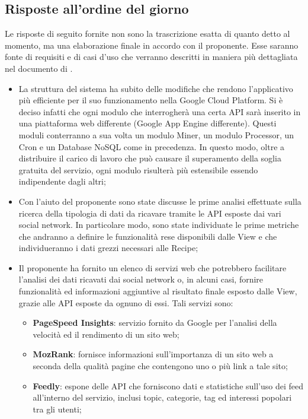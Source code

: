 \subsection{Risposte all'ordine del giorno}
Le risposte di seguito fornite non sono la trascrizione esatta di quanto detto al momento, ma una elaborazione finale in accordo con il proponente. \newline
Esse saranno fonte di requisiti e di casi d'uso che verranno descritti in maniera più dettagliata nel documento di \docNameVersionAdR.
\begin{itemize}
  \item La struttura del sistema ha subito delle modifiche che rendono l'applicativo più efficiente per il suo funzionamento nella Google Cloud Platform. Si è deciso infatti che ogni modulo che interrogherà una certa API sarà inserito in una piattaforma web differente (Google App Engine differente). Questi moduli conterranno a sua volta un modulo Miner, un modulo Processor, un Cron e un Database NoSQL come in precedenza. In questo modo, oltre a distribuire il carico di lavoro che può causare il superamento della soglia gratuita del servizio, ogni modulo risulterà più estensibile essendo indipendente dagli altri;
  \item Con l'aiuto del proponente sono state discusse le prime analisi effettuate sulla ricerca della tipologia di dati da ricavare tramite le API esposte dai vari social network. In particolare modo, sono state individuate le prime metriche che andranno a definire le funzionalità rese disponibili dalle View e che individueranno i dati grezzi necessari alle Recipe;
  \item Il proponente ha fornito un elenco di servizi web che potrebbero facilitare l'analisi dei dati ricavati dai social network o, in alcuni casi, fornire funzionalità ed informazioni aggiuntive al risultato finale esposto dalle View, grazie alle API esposte da ognuno di essi. Tali servizi sono:
  \begin{itemize}
    \item \textbf{PageSpeed Insights}: servizio fornito da Google per l'analisi della velocità ed il rendimento di un sito web;
    \item \textbf{MozRank}: fornisce informazioni sull'importanza di un sito web a seconda della qualità pagine che contengono uno o più link a tale sito;
    \item \textbf{Feedly}: espone delle API che forniscono dati e statistiche sull'uso dei feed all'interno del servizio, inclusi topic, categorie, tag ed interessi popolari tra gli utenti;

\end{itemize}
\end{itemize}
